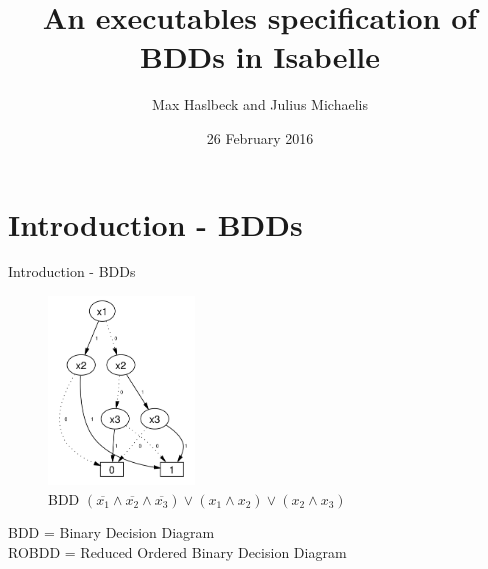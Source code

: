 \documentclass[%
	sans,
	12pt,
]{beamer}
\title{An executables specification of BDDs in Isabelle}
\author{\normalsize Max Haslbeck and Julius Michaelis}
\institute[]{\footnotesize Fakultät für Informatik\\TU München}
\date{\footnotesize 26 February 2016}
\begin{document}
\maketitle


\section{Introduction - BDDs}
\begin{frame}{Introduction - BDDs}
\begin{figure}[htbp]
  \centering
  \includegraphics[height=5cm]{img/BDD_simple.png}
  \caption{BDD $(\overline{x_1} \land \overline{x_2} \land \overline{x_3}) \lor
           (x_1 \land x_2) \lor (x_2 \land x_3) $}
\end{figure}
  BDD = Binary Decision Diagram \\
  ROBDD = Reduced Ordered Binary Decision Diagram
\end{frame}
\end{document}
